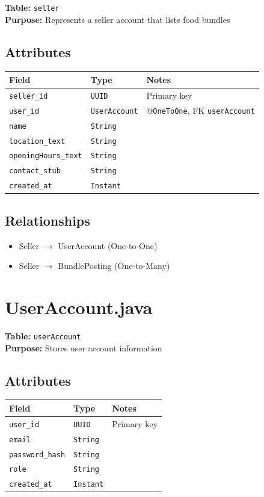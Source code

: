 \documentclass[a4paper,11pt]{article}
\begin{document}
\textbf{Table:} \texttt{seller} \\
\textbf{Purpose:} Represents a seller account that lists food bundles

\subsection*{Attributes}
\begin{longtable}{|p{4cm}|p{3cm}|p{6cm}|}
\hline
\textbf{Field} & \textbf{Type} & \textbf{Notes} \\
\hline
\texttt{seller\_id} & \texttt{UUID} & Primary key \\
\texttt{user\_id} & \texttt{UserAccount} & @\texttt{OneToOne}, FK \texttt{userAccount} \\
\texttt{name} & \texttt{String} &  \\
\texttt{location\_text} & \texttt{String} &  \\
\texttt{openingHours\_text} & \texttt{String} &  \\
\texttt{contact\_stub} & \texttt{String} &  \\
\texttt{created\_at} & \texttt{Instant} & \\
\hline
\end{longtable}

\subsection*{Relationships}
\begin{itemize}
  \item Seller $\rightarrow$ UserAccount (One-to-One)
  \item Seller $\rightarrow$ BundlePosting (One-to-Many)
\end{itemize}


\section{UserAccount.java}

\textbf{Table:} \texttt{userAccount} \\
\textbf{Purpose:} Stores user account information



\subsection*{Attributes}
\begin{longtable}{|p{4cm}|p{3cm}|p{6cm}|}
\hline
\textbf{Field} & \textbf{Type} & \textbf{Notes} \\
\hline
\texttt{user\_id} & \texttt{UUID} & Primary key \\
\texttt{email} & \texttt{String} &  \\
\texttt{password\_hash} & \texttt{String} &  \\
\texttt{role} & \texttt{String} &  \\
\texttt{created\_at} & \texttt{Instant} &  \\
\hline



\end{longtable}
\end{document}

